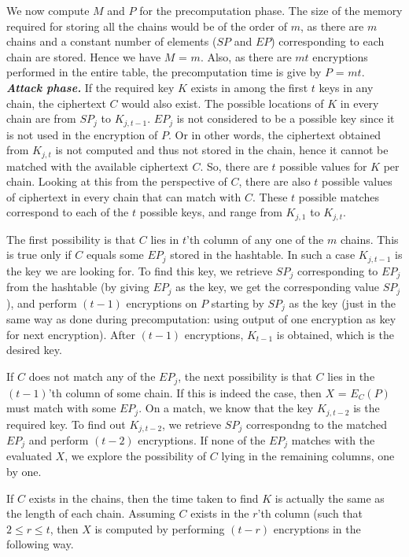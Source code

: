 We now compute $M$ and $P$ for the precomputation phase. The size of the memory required for storing all the chains would be of the order of $m$, as there are $m$ chains and a constant number of elements ($SP$ and $EP$) corresponding to each chain are stored. Hence we have $M$ = $m$. Also, as there are $mt$ encryptions performed in the entire table, the precomputation time is give by $P$ = $mt$.\\

\noindent  \textit{\textbf{Attack phase.}} If the required key $K$ exists in among the first $t$ keys in any chain, the ciphertext $C$ would also exist. The possible locations of $K$ in every chain are from $SP_j$ to $K_{j,t-1}$. $EP_j$ is not considered to be a possible key since it is not used in the encryption of $P$. Or in other words, the ciphertext obtained from $K_{j,t}$ is not computed and thus not stored in the chain, hence it cannot be matched with the available ciphertext $C$. So, there are $t$ possible values for $K$ per chain. Looking at this from the perspective of $C$, there are also $t$ possible values of ciphertext in every chain that can match with $C$. These $t$ possible matches correspond to each of the $t$ possible keys, and range from $K_{j,1}$ to $K_{j,t}$.

The first possibility is that $C$ lies in $t$'th column of any one of the $m$ chains. This is true only if $C$ equals some $EP_j$ stored in the hashtable. In such a case $K_{j,t-1}$ is the key we are looking for. To find this key, we retrieve $SP_j$ corresponding to $EP_j$ from the hashtable (by giving $EP_j$ as the key, we get the corresponding value $SP_j$), and perform $(t-1)$ encryptions on $P$ starting by $SP_j$ as the key (just in the same way as done during precomputation: using output of one encryption as key for next encryption). After $(t-1)$ encryptions, $K_{t-1}$ is obtained, which is the desired key. 

If $C$ does not match any of the $EP_j$, the next possibility is that $C$ lies in the $(t-1)$'th column of some chain. If this is indeed the case, then $X$ = $E_{C}(P)$ must match with some $EP_j$. On a match, we know that the key $K_{j,t-2}$ is the required key. To find out $K_{j,t-2}$, we retrieve $SP_j$ correspondng to the matched $EP_j$ and perform $(t-2)$ encryptions. If none of the $EP_j$ matches with the evaluated $X$, we explore the possibility of $C$ lying in the remaining columns, one by one.

If $C$ exists in the chains, then the time taken to find $K$ is actually the same as the length of each chain. Assuming $C$ exists in the $r$'th column (such that  $2 \leq r \leq t$, then $X$ is computed by performing $(t-r)$ encryptions in the following way.

